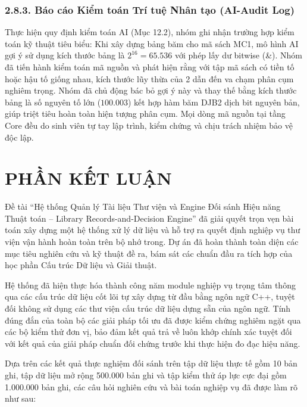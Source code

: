\documentclass[14pt,a4paper]{extarticle}
\begin{document}
\subsubsection*{2.8.3. Báo cáo Kiểm toán Trí tuệ Nhân tạo (AI-Audit Log)}

Thực hiện quy định kiểm toán AI (Mục 12.2), nhóm ghi nhận trường hợp kiểm toán kỹ thuật tiêu biểu: Khi xây dựng bảng băm cho mã sách MC1, mô hình AI gợi ý sử dụng kích thước bảng là $2^{16} = 65.536$ với phép lấy dư bitwise (\&). Nhóm đã tiến hành kiểm toán mã nguồn và phát hiện rằng với tập mã sách có tiền tố hoặc hậu tố giống nhau, kích thước lũy thừa của 2 dẫn đến va chạm phân cụm nghiêm trọng. Nhóm đã chủ động bác bỏ gợi ý này và thay thế bằng kích thước bảng là số nguyên tố lớn ($100.003$) kết hợp hàm băm DJB2 dịch bit nguyên bản, giúp triệt tiêu hoàn toàn hiện tượng phân cụm. Mọi dòng mã nguồn tại tầng Core đều do sinh viên tự tay lập trình, kiểm chứng và chịu trách nhiệm bảo vệ độc lập.

\newpage
\section*{PHẦN KẾT LUẬN}

Đề tài ``Hệ thống Quản lý Tài liệu Thư viện và Engine Đối sánh Hiệu năng Thuật toán -- Library Records-and-Decision Engine'' đã giải quyết trọn vẹn bài toán xây dựng một hệ thống xử lý dữ liệu và hỗ trợ ra quyết định nghiệp vụ thư viện vận hành hoàn toàn trên bộ nhớ trong. Dự án đã hoàn thành toàn diện các mục tiêu nghiên cứu và kỹ thuật đề ra, bám sát các chuẩn đầu ra tích hợp của học phần Cấu trúc Dữ liệu và Giải thuật.

Hệ thống đã hiện thực hóa thành công năm module nghiệp vụ trọng tâm thông qua các cấu trúc dữ liệu cốt lõi tự xây dựng từ đầu bằng ngôn ngữ C++, tuyệt đối không sử dụng các thư viện cấu trúc dữ liệu dựng sẵn của ngôn ngữ. Tính đúng đắn của toàn bộ các giải pháp tối ưu đã được kiểm chứng nghiêm ngặt qua các bộ kiểm thử đơn vị, bảo đảm kết quả trả về luôn khớp chính xác tuyệt đối với kết quả của giải pháp chuẩn đối chứng trước khi thực hiện đo đạc hiệu năng.

Dựa trên các kết quả thực nghiệm đối sánh trên tập dữ liệu thực tế gồm 10 bản ghi, tập dữ liệu mở rộng 500.000 bản ghi và tập kiểm thử áp lực cực đại gồm 1.000.000 bản ghi, các câu hỏi nghiên cứu và bài toán nghiệp vụ đã được làm rõ như sau:
\end{document}
